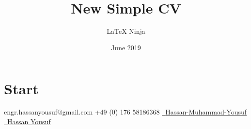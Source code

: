 \documentclass[lighthipster]{simplehipstercv}
\title{New Simple CV}
\author{\LaTeX{} Ninja}
\date{June 2019}
\begin{document}
\thispagestyle{empty}

\section*{Start}
\vspace{-1mm}
\linebreak
\linebreak\linebreak\linebreak

\begin{center}
\fontfamily{\sfdefault}\selectfont \color{white}
   engr.hassanyousuf@gmail.com 
   +49 (0) 176 58186368
   \href{https://github.com/Hassan-Muhammad-Yousuf}{\raisebox{-0.1\height}\faGithub\ {Hassan-Muhammad-Yousuf}} \\
  \href{https://www.linkedin.com/in/hassan-yousuf-30326b148/}{\raisebox{-0.1\height}\faLinkedinSquare\ {Hassan Yousuf}} \\
\end{center}


\end{document}
